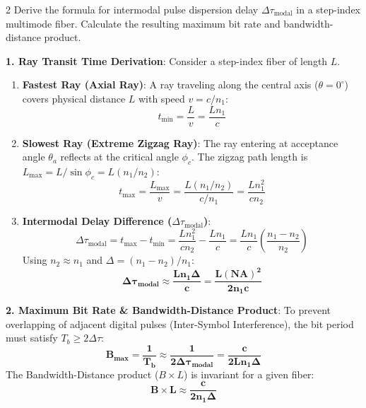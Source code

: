 \begin{theoryq}{2}
Derive the formula for intermodal pulse dispersion delay $\Delta \tau_{\text{modal}}$ in a step-index multimode fiber. Calculate the resulting maximum bit rate and bandwidth-distance product.
\end{theoryq}
\begin{theorysol}
\textbf{1. Ray Transit Time Derivation}:
Consider a step-index fiber of length $L$.
\begin{enumerate}
    \item \textbf{Fastest Ray (Axial Ray)}:
    A ray traveling along the central axis ($\theta = 0^\circ$) covers physical distance $L$ with speed $v = c/n_1$:
    \begin{equation}
    t_{\text{min}} = \frac{L}{v} = \frac{L n_1}{c}
    \end{equation}
    \item \textbf{Slowest Ray (Extreme Zigzag Ray)}:
    The ray entering at acceptance angle $\theta_a$ reflects at the critical angle $\phi_c$. The zigzag path length is $L_{\text{max}} = L/\sin\phi_c = L(n_1/n_2)$:
    \begin{equation}
    t_{\text{max}} = \frac{L_{\text{max}}}{v} = \frac{L(n_1/n_2)}{c/n_1} = \frac{L n_1^2}{c n_2}
    \end{equation}
    \item \textbf{Intermodal Delay Difference ($\Delta \tau_{\text{modal}}$)}:
    \begin{equation}
    \Delta \tau_{\text{modal}} = t_{\text{max}} - t_{\text{min}} = \frac{L n_1^2}{c n_2} - \frac{L n_1}{c} = \frac{L n_1}{c}\left(\frac{n_1 - n_2}{n_2}\right)
    \end{equation}
    Using $n_2 \approx n_1$ and $\Delta = (n_1 - n_2)/n_1$:
    \begin{equation}
    \mathbf{\Delta \tau_{\text{modal}} \approx \frac{L n_1 \Delta}{c} = \frac{L (\text{NA})^2}{2 n_1 c}}
    \end{equation}
\end{enumerate}

\textbf{2. Maximum Bit Rate \& Bandwidth-Distance Product}:
To prevent overlapping of adjacent digital pulses (Inter-Symbol Interference), the bit period must satisfy $T_b \ge 2\Delta\tau$:
\begin{equation}
\mathbf{B_{\text{max}} = \frac{1}{T_b} \approx \frac{1}{2\Delta \tau_{\text{modal}}} = \frac{c}{2 L n_1 \Delta}}
\end{equation}
The Bandwidth-Distance product ($B \times L$) is invariant for a given fiber:
\begin{equation}
\mathbf{B \times L \approx \frac{c}{2 n_1 \Delta}}
\end{equation}
\end{theorysol}
\vspace{4mm}

